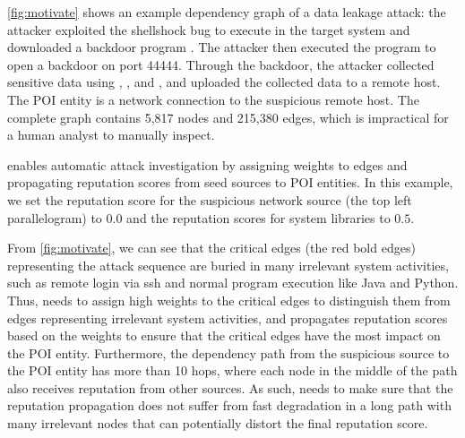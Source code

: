 \cref{fig:motivate} shows an example dependency graph of a data leakage attack:
the attacker exploited the shellshock bug to execute  in the target system and downloaded a backdoor program . The attacker then executed the  program to open a backdoor
on port 44444. Through the backdoor, the attacker collected sensitive data using , , and , and uploaded the collected data to a remote host.
The POI entity is a network connection to the suspicious remote host. The complete graph contains 5,817 nodes and 215,380 edges, which is impractical for a human analyst to manually inspect.

\tool enables automatic attack investigation by assigning weights to edges and propagating reputation scores from seed sources to POI entities.
In this example, we set the reputation score for the suspicious network source (\ie the top left parallelogram)
to $0.0$ and the reputation scores for 
system libraries to $0.5$.

From \cref{fig:motivate}, we can see that the critical edges (\ie the red bold edges) representing the attack sequence are buried in many irrelevant system activities, such as remote login via ssh and normal program execution like Java and Python.
Thus, \tool needs to assign high weights to the critical edges to distinguish them from edges representing irrelevant system activities, 
and propagates reputation scores based on the weights to ensure that the critical edges have the most impact on the POI entity. 
Furthermore, the dependency path from the suspicious source to the POI entity has more than 10 hops, where each node in the middle of the path also receives reputation from other sources.
As such, \tool needs to make sure that the reputation propagation does not suffer from fast degradation in a long path with many irrelevant nodes that can potentially distort the final reputation score.

